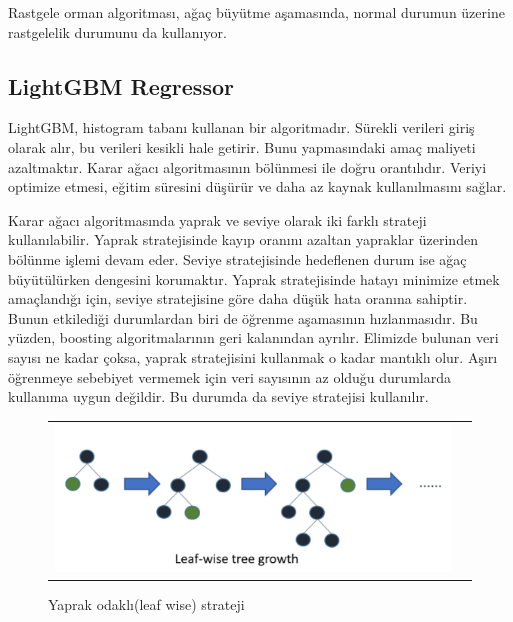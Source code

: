 \documentclass[conference]{IEEEtran}
\begin{document}
\quad Rastgele orman algoritması, ağaç büyütme aşamasında, normal durumun üzerine rastgelelik durumunu da kullanıyor\cite{12}.

\pagebreak
\subsection{\textbf{LightGBM Regressor}}
\quad LightGBM, histogram tabanı kullanan bir algoritmadır. Sürekli verileri giriş olarak alır, bu verileri kesikli hale getirir. Bunu yapmasındaki amaç maliyeti azaltmaktır. Karar ağacı algoritmasının bölünmesi ile doğru orantılıdır. Veriyi optimize etmesi, eğitim süresini düşürür ve daha az kaynak kullanılmasını sağlar\cite{13}.

\quad Karar ağacı algoritmasında yaprak ve seviye olarak iki farklı strateji kullanılabilir. Yaprak stratejisinde kayıp oranını azaltan yapraklar üzerinden bölünme işlemi devam eder. Seviye stratejisinde hedeflenen durum ise ağaç büyütülürken dengesini korumaktır. Yaprak stratejisinde hatayı minimize etmek amaçlandığı için, seviye stratejisine göre daha düşük hata oranına sahiptir. Bunun etkilediği durumlardan biri de öğrenme aşamasının hızlanmasıdır. Bu yüzden, boosting algoritmalarının geri kalanından ayrılır. Elimizde bulunan veri sayısı ne kadar çoksa, yaprak stratejisini kullanmak o kadar mantıklı olur. Aşırı öğrenmeye sebebiyet vermemek için veri sayısının az olduğu durumlarda kullanıma uygun değildir. Bu durumda da seviye stratejisi kullanılır\cite{13}.

\begin{figure}[!h]
	\centering
	\begin{center}
		\begin{tabular}{cc}
			\includegraphics[scale=0.5]{pictures/pic_05.png}&
		\end{tabular}
	\end{center}
	\caption{Yaprak odaklı(leaf wise) strateji\cite{13}}
	\label{fig:05}
\end{figure}
\end{document}
